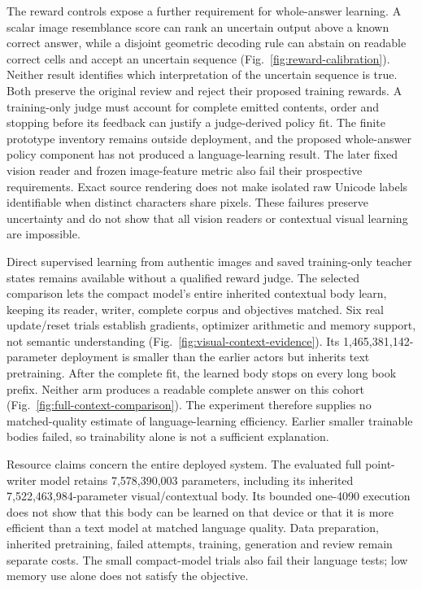 \documentclass[12pt,a4paper]{article}
\providecommand{\DIFadd}[1]{{\protect\color{blue} \sf #1}} %
\begin{document}
\DIFadd{The reward controls expose a further requirement for whole-answer learning.
A scalar image resemblance score can rank an uncertain output above a known
correct answer, while a disjoint geometric decoding rule can abstain on readable
correct cells and accept an uncertain sequence (Fig.~\ref{fig:reward-calibration}).
Neither result identifies which interpretation of the uncertain sequence is
true. Both preserve the original review and reject their proposed training
rewards. A training-only judge must account for complete emitted contents,
order and stopping before its feedback can justify a judge-derived policy fit. The
finite prototype inventory remains outside deployment, and the proposed
whole-answer policy component has not produced a language-learning result.
The later fixed vision reader and frozen image-feature metric also fail their
prospective requirements. Exact source rendering does not make isolated raw
Unicode labels identifiable when distinct characters share pixels. These
failures preserve uncertainty and do not show that all vision readers or
contextual visual learning are impossible.
}

\DIFadd{Direct supervised learning from authentic images and saved training-only
teacher states remains available without a qualified reward judge. The selected
comparison lets the compact model's entire inherited contextual body learn,
keeping its reader, writer, complete corpus and objectives matched. Six real
update/reset trials establish gradients, optimizer arithmetic and memory
support, not semantic understanding (Fig.~\ref{fig:visual-context-evidence}).
Its 1,465,381,142-parameter deployment is smaller than the earlier actors but
inherits text pretraining. After the complete fit, the learned body stops on every long book prefix.
Neither arm produces a readable complete answer on this cohort
(Fig.~\ref{fig:full-context-comparison}). The experiment therefore supplies
no matched-quality estimate of language-learning efficiency. Earlier smaller trainable
bodies failed, so trainability alone is not a sufficient explanation.
}

\DIFadd{Resource claims concern the entire deployed system. The evaluated full
point-writer model retains 7,578,390,003 parameters, including its inherited
7,522,463,984-parameter visual/contextual body. Its bounded one-4090 execution
does not show that this body can be learned on that device or that it is more
efficient than a text model at matched language quality. Data preparation,
inherited pretraining, failed attempts, training, generation and review remain
separate costs. The small compact-model trials also fail their language tests;
low memory use alone does not satisfy the objective.
}
\end{document}
